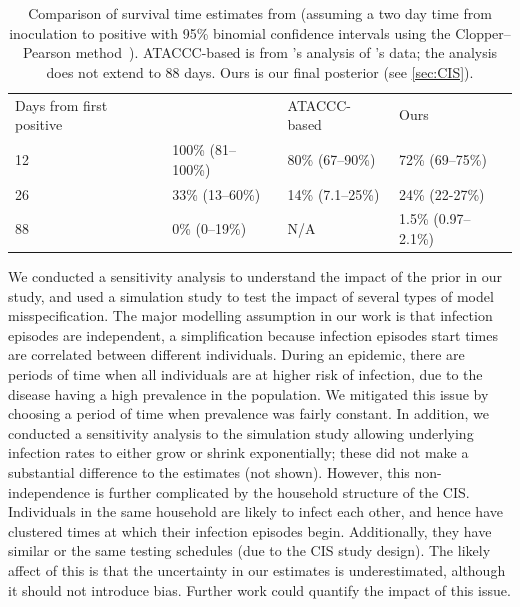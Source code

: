 \documentclass[referee,useAMS,usenatbib]{biom}
\begin{document}
\begin{table}[]
\caption{
    Comparison of survival time estimates from
     (assuming a two day time from inoculation to positive with 95\% binomial confidence intervals using the Clopper--Pearson method~\citep{clopperUse}).
    ATACCC-based is from \citet{blakeThesis}'s analysis of \citet{hakkiOnset}'s data; the analysis does not extend to 88 days.
    Ours is our final posterior (see \cref{sec:CIS}).
}
\centering
\begin{tabular}{llll}
Days from first positive & \citet{killingleySafety}  & ATACCC-based     & Ours                \\
12                       & 100\% (81--100\%) & 80\% (67--90\%)  & 72\% (69--75\%)     \\
26                       & 33\% (13--60\%)   & 14\% (7.1--25\%) & 24\% (22-27\%)      \\
88                       & 0\% (0--19\%)     & N/A              & 1.5\% (0.97--2.1\%)
\end{tabular}
\label{tab:compare-survival}
\end{table}

We conducted a sensitivity analysis to understand the impact of the prior in our study, and used a simulation study to test the impact of several types of model misspecification.
The major modelling assumption in our work is that infection episodes are independent, a simplification because infection episodes start times are correlated between different individuals.
During an epidemic, there are periods of time when all individuals are at higher risk of infection, due to the disease having a high prevalence in the population.
We mitigated this issue by choosing a period of time when prevalence was fairly constant.
In addition, we conducted a sensitivity analysis to the simulation study allowing underlying infection rates to either grow or shrink exponentially; these did not make a substantial difference to the estimates (not shown).
However, this non-independence is further complicated by the household structure of the CIS.
Individuals in the same household are likely to infect each other, and hence have clustered times at which their infection episodes begin.
Additionally, they have similar or the same testing schedules (due to the CIS study design).
The likely affect of this is that the uncertainty in our estimates is underestimated, although it should not introduce bias.
Further work could quantify the impact of this issue.
\end{document}
